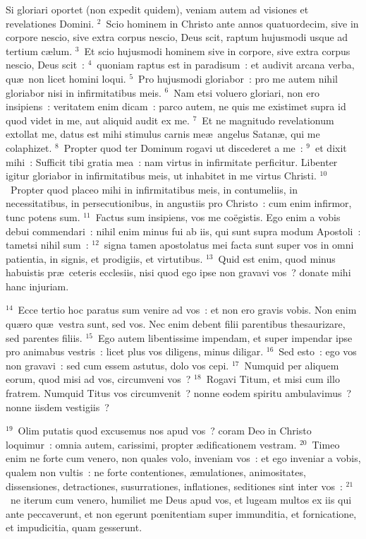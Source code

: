 \bchapter
\lettrine[lines=3,image=true,loversize=0.05,lraise=-0.03]{S}{}i gloriari oportet (non expedit quidem), veniam autem ad visiones et revelationes Domini.
${}^{2}$~Scio hominem in Christo ante annos quatuordecim, sive in corpore nescio, sive extra corpus nescio, Deus scit, raptum hujusmodi usque ad tertium c\ae lum.
${}^{3}$~Et scio hujusmodi hominem sive in corpore, sive extra corpus nescio, Deus scit~:
${}^{4}$~quoniam raptus est in paradisum~: et audivit arcana verba, qu\ae\ non licet homini loqui.
${}^{5}$~Pro hujusmodi gloriabor~: pro me autem nihil gloriabor nisi in infirmitatibus meis.
${}^{6}$~Nam etsi voluero gloriari, non ero insipiens~: veritatem enim dicam~: parco autem, ne quis me existimet supra id quod videt in me, aut aliquid audit ex me.
${}^{7}$~Et ne magnitudo revelationum extollat me, datus est mihi stimulus carnis me\ae\ angelus Satan\ae , qui me colaphizet.
${}^{8}$~Propter quod ter Dominum rogavi ut discederet a me~:
${}^{9}$~et dixit mihi~: Sufficit tibi gratia mea~: nam virtus in infirmitate perficitur. Libenter igitur gloriabor in infirmitatibus meis, ut inhabitet in me virtus Christi.
${}^{10}$~Propter quod placeo mihi in infirmitatibus meis, in contumeliis, in necessitatibus, in persecutionibus, in angustiis pro Christo~: cum enim infirmor, tunc potens sum.
${}^{11}$~Factus sum insipiens, vos me co\"egistis. Ego enim a vobis debui commendari~: nihil enim minus fui ab iis, qui sunt supra modum Apostoli~: tametsi nihil sum~:
${}^{12}$~signa tamen apostolatus mei facta sunt super vos in omni patientia, in signis, et prodigiis, et virtutibus.
${}^{13}$~Quid est enim, quod minus habuistis pr\ae\ ceteris ecclesiis, nisi quod ego ipse non gravavi vos~? donate mihi hanc injuriam.


${}^{14}$~Ecce tertio hoc paratus sum venire ad vos~: et non ero gravis vobis. Non enim qu\ae ro qu\ae\ vestra sunt, sed vos. Nec enim debent filii parentibus thesaurizare, sed parentes filiis.
${}^{15}$~Ego autem libentissime impendam, et super impendar ipse pro animabus vestris~: licet plus vos diligens, minus diligar.
${}^{16}$~Sed esto~: ego vos non gravavi~: sed cum essem astutus, dolo vos cepi.
${}^{17}$~Numquid per aliquem eorum, quod misi ad vos, circumveni vos~?
${}^{18}$~Rogavi Titum, et misi cum illo fratrem. Numquid Titus vos circumvenit~? nonne eodem spiritu ambulavimus~? nonne iisdem vestigiis~?


${}^{19}$~Olim putatis quod excusemus nos apud vos~? coram Deo in Christo loquimur~: omnia autem, carissimi, propter \ae dificationem vestram.
${}^{20}$~Timeo enim ne forte cum venero, non quales volo, inveniam vos~: et ego inveniar a vobis, qualem non vultis~: ne forte contentiones, \ae mulationes, animositates, dissensiones, detractiones, susurrationes, inflationes, seditiones sint inter vos~:
${}^{21}$~ne iterum cum venero, humiliet me Deus apud vos, et lugeam multos ex iis qui ante peccaverunt, et non egerunt pœnitentiam super immunditia, et fornicatione, et impudicitia, quam gesserunt.

